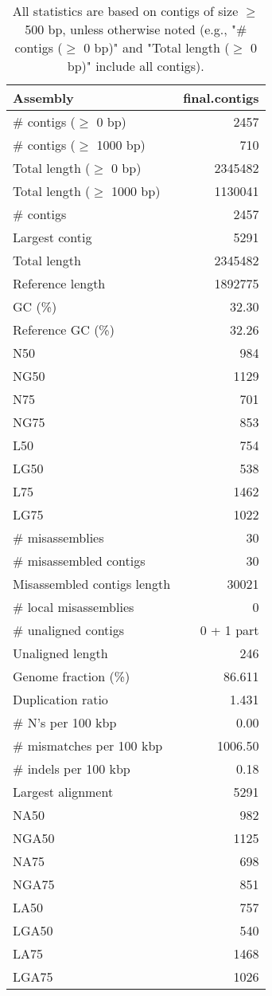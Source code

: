 \documentclass[12pt,a4paper]{article}
\begin{document}
\begin{table}[ht]
\begin{center}
\caption{All statistics are based on contigs of size $\geq$ 500 bp, unless otherwise noted (e.g., "\# contigs ($\geq$ 0 bp)" and "Total length ($\geq$ 0 bp)" include all contigs).}
\begin{tabular}{|l*{1}{|r}|}
\hline
Assembly & final.contigs \\ \hline
\# contigs ($\geq$ 0 bp) & 2457 \\ \hline
\# contigs ($\geq$ 1000 bp) & 710 \\ \hline
Total length ($\geq$ 0 bp) & 2345482 \\ \hline
Total length ($\geq$ 1000 bp) & 1130041 \\ \hline
\# contigs & 2457 \\ \hline
Largest contig & 5291 \\ \hline
Total length & 2345482 \\ \hline
Reference length & 1892775 \\ \hline
GC (\%) & 32.30 \\ \hline
Reference GC (\%) & 32.26 \\ \hline
N50 & 984 \\ \hline
NG50 & 1129 \\ \hline
N75 & 701 \\ \hline
NG75 & 853 \\ \hline
L50 & 754 \\ \hline
LG50 & 538 \\ \hline
L75 & 1462 \\ \hline
LG75 & 1022 \\ \hline
\# misassemblies & 30 \\ \hline
\# misassembled contigs & 30 \\ \hline
Misassembled contigs length & 30021 \\ \hline
\# local misassemblies & 0 \\ \hline
\# unaligned contigs & 0 + 1 part \\ \hline
Unaligned length & 246 \\ \hline
Genome fraction (\%) & 86.611 \\ \hline
Duplication ratio & 1.431 \\ \hline
\# N's per 100 kbp & 0.00 \\ \hline
\# mismatches per 100 kbp & 1006.50 \\ \hline
\# indels per 100 kbp & 0.18 \\ \hline
Largest alignment & 5291 \\ \hline
NA50 & 982 \\ \hline
NGA50 & 1125 \\ \hline
NA75 & 698 \\ \hline
NGA75 & 851 \\ \hline
LA50 & 757 \\ \hline
LGA50 & 540 \\ \hline
LA75 & 1468 \\ \hline
LGA75 & 1026 \\ \hline
\end{tabular}
\end{center}
\end{table}
\end{document}
